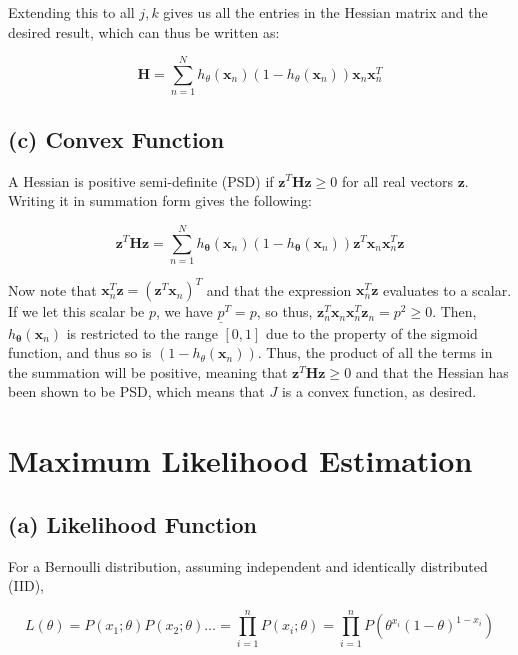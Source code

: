 \documentclass[11pt]{article}
\newcommand{\sol}[1]{{\bf{\color{magenta}{{Solution:}}}}}
\begin{document}
Extending this to all $j, k$ gives us all the entries in the Hessian matrix and the desired result, which can thus be written as:

$$
\mathbf{H}=\sum_{n=1}^{N} h_{\theta}\left(\mathbf{x}_{n}\right)\left(1-h_{\theta}\left(\mathbf{x}_{n}\right)\right) \mathbf{x}_{n} \mathbf{x}_{n}^{T}
$$

\subsection{(c) Convex Function}
\sol x A Hessian is positive semi-definite (PSD) if $\mathbf{z}^{T} \mathbf{H z} \geq 0$ for all real vectors $\mathbf{z}$. Writing it in summation form gives the following:

$$
\mathbf{z}^{T} \mathbf{H z}=\sum_{n=1}^{N} h_{\boldsymbol{\theta}}\left(\mathbf{x}_{n}\right)\left(1-h_{\boldsymbol{\theta}}\left(\mathbf{x}_{n}\right)\right) \mathbf{z}^{T} \mathbf{x}_{n} \mathbf{x}_{n}^{T} \mathbf{z}
$$

Now note that $\mathbf{x}_{n}^{T} \mathbf{z}=\left(\mathbf{z}^{T} \mathbf{x}_{n}\right)^{T}$ and that the expression $\mathbf{x}_{n}^{T} \mathbf{z}$ evaluates to a scalar. If we let this scalar be $p$, we have $\underline{p}^{T}=p$, so thus, $\mathbf{z}_{n}^{T} \mathbf{x}_{n} \mathbf{x}_{n}^{T} \mathbf{z}_{n}=p^{2} \geq 0$. Then, $h_{\boldsymbol{\theta}}\left(\mathbf{x}_{n}\right)$ is restricted to the range $[0,1]$ due to the property of the sigmoid function, and thus so is $\left(1-h_{\theta}\left(\mathbf{x}_{n}\right)\right)$. Thus, the product of all the terms in the summation will be positive, meaning that $\mathbf{z}^{T} \mathbf{H z} \geq 0$ and that the Hessian has been shown to be PSD, which means that $J$ is a convex function, as desired. 

\section{Maximum Likelihood Estimation}

\subsection{(a) Likelihood Function}
\sol x For a Bernoulli distribution, assuming independent and identically distributed (IID),

$$
L(\theta)=P\left(x_{1} ; \theta\right) P\left(x_{2} ; \theta\right) \ldots=\prod_{i=1}^{n} P\left(x_{i} ; \theta\right)=\prod_{i=1}^{n} P\left(\theta^{x_{i}}(1-\theta)^{1-x_{i}}\right)
$$
\end{document}

